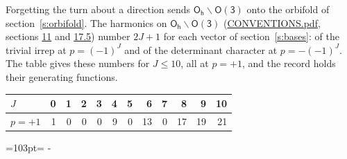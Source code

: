 \documentclass[10pt,a4paper]{article}
\newcommand{\needspace}[1]{\par\penalty-100\begingroup\dimen0=#1\relax\dimen2=\pagegoal
  \advance\dimen2-\pagetotal\ifdim\dimen0>\dimen2\relax\ifdim\dimen2>0pt\vfil\break\fi\fi
  \endgroup}
\numberwithin{equation}{section}
\newcommand{\grp}[1]{\mathsf{#1}}
\begin{document}
Forgetting the turn about a direction sends $\grp{O_{h}}\backslash\grp{O(3)}$ onto the orbifold of section~\ref{s:orbifold}.
The harmonics on $\grp{O_{h}}\backslash\grp{O(3)}$ (\href{../../CONVENTIONS.pdf}{CONVENTIONS.pdf}, sections \href{../../CONVENTIONS.pdf\#conv.11}{11} and \href{../../CONVENTIONS.pdf\#conv.17.5}{17.5}) number $2J + 1$ for each vector of section~\ref{s:bases}: of the trivial irrep at $p = (-1)^J$ and of the determinant character at $p = -(-1)^J$. The table gives these numbers for $J \le 10$, all at $p = +1$, and the record holds their generating functions.
{\small\setlength{\tabcolsep}{4pt}\begin{longtable}{@{}lrrrrrrrrrrr@{}}\toprule
$J$ & 0 & 1 & 2 & 3 & 4 & 5 & 6 & 7 & 8 & 9 & 10\\\midrule\endhead
\bottomrule\endfoot\endlastfoot
$p = +1$ & 1 & 0 & 0 & 0 & 9 & 0 & 13 & 0 & 17 & 19 & 21\\
\bottomrule\end{longtable}}
\needspace{103pt}
\end{document}
